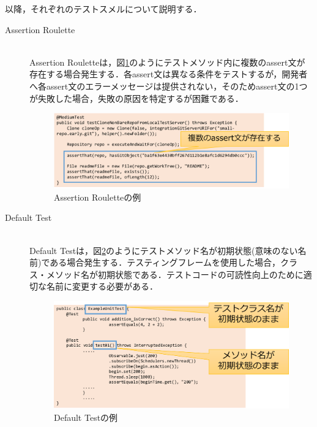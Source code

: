 \documentclass[12pt]{jarticle} %
\begin{document}
以降，それぞれのテストスメルについて説明する．

\begin{description}
\item[Assertion Roulette]~\\
Assertion Rouletteは，図\ref{AR}のようにテストメソッド内に複数のassert文が存在する場合発生する．各assert文は異なる条件をテストするが，開発者へ各assert文のエラーメッセージは提供されない，そのためassert文の1つが失敗した場合，失敗の原因を特定するが困難である．

\begin{figure}[h]
  \begin{center}
    \includegraphics[clip,width=15cm]{AR.pdf}
    \caption{Assertion Rouletteの例}
    \label{AR}
  \end{center}
\end{figure}

\item[Default Test]~\\
Default Testは，図\ref{DT}のようにテストメソッド名が初期状態(意味のない名前)である場合発生する．テスティングフレームを使用した場合，クラス・メソッド名が初期状態である．テストコードの可読性向上のために適切な名前に変更する必要がある．


\begin{figure}[h]
  \begin{center}
    \includegraphics[clip,width=15cm]{DT.pdf}
    \caption{Default Testの例}
    \label{DT}
  \end{center}
\end{figure}


\end{description}
\end{document}
